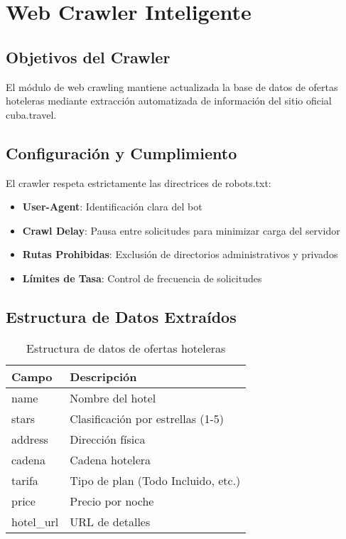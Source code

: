 \documentclass[runningheads]{llncs}
\begin{document}
\section{Web Crawler Inteligente}

\subsection{Objetivos del Crawler}

El módulo de web crawling mantiene actualizada la base de datos de ofertas hoteleras mediante extracción automatizada de información del sitio oficial cuba.travel.

\subsection{Configuración y Cumplimiento}

El crawler respeta estrictamente las directrices de robots.txt:

\begin{itemize}
\item \textbf{User-Agent}: Identificación clara del bot
\item \textbf{Crawl Delay}: Pausa entre solicitudes para minimizar carga del servidor
\item \textbf{Rutas Prohibidas}: Exclusión de directorios administrativos y privados
\item \textbf{Límites de Tasa}: Control de frecuencia de solicitudes
\end{itemize}

\subsection{Estructura de Datos Extraídos}

\begin{table}[H]
\centering
\begin{tabular}{ll}
\toprule
\textbf{Campo} & \textbf{Descripción} \\
\midrule
name & Nombre del hotel \\
stars & Clasificación por estrellas (1-5) \\
address & Dirección física \\
cadena & Cadena hotelera \\
tarifa & Tipo de plan (Todo Incluido, etc.) \\
price & Precio por noche \\
hotel\_url & URL de detalles \\
\bottomrule
\end{tabular}
\caption{Estructura de datos de ofertas hoteleras}
\end{table}
\end{document}
